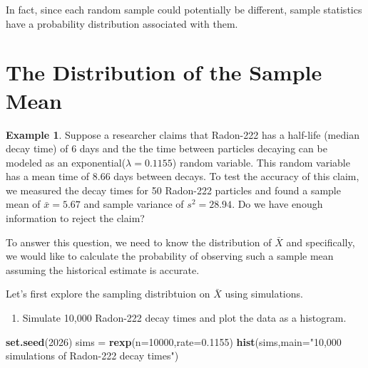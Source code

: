 \documentclass[
  11pt,
  oneside]{book}
\newenvironment{Shaded}{\begin{snugshade}}{\end{snugshade}}
\newcommand{\AttributeTok}[1]{\textcolor[rgb]{0.13,0.29,0.53}{#1}}
\newcommand{\DecValTok}[1]{\textcolor[rgb]{0.00,0.00,0.81}{#1}}
\newcommand{\FloatTok}[1]{\textcolor[rgb]{0.00,0.00,0.81}{#1}}
\newcommand{\FunctionTok}[1]{\textcolor[rgb]{0.13,0.29,0.53}{\textbf{#1}}}
\newcommand{\NormalTok}[1]{#1}
\newcommand{\OtherTok}[1]{\textcolor[rgb]{0.56,0.35,0.01}{#1}}
\newcommand{\StringTok}[1]{\textcolor[rgb]{0.31,0.60,0.02}{#1}}
\providecommand{\tightlist}{%
  \setlength{\itemsep}{0pt}\setlength{\parskip}{0pt}}
\theoremstyle{definition}
\theoremstyle{definition}
\newtheorem{example}{Example}[chapter]
\theoremstyle{definition}
\theoremstyle{definition}
\theoremstyle{remark}
\begin{document}
In fact, since each random sample could potentially be different, sample statistics have a probability distribution associated with them.

\newpage

\section{The Distribution of the Sample Mean}\label{the-distribution-of-the-sample-mean}

\begin{example}
Suppose a researcher claims that Radon-222 has a half-life (median decay time) of 6 days and the the time between particles decaying can be modeled as an exponential(\(\lambda = 0.1155\)) random variable. This random variable has a mean time of 8.66 days between decays. To test the accuracy of this claim, we measured the decay times for 50 Radon-222 particles and found a sample mean of \(\bar{x} = 5.67\) and sample variance of \(s^2 = 28.94\). Do we have enough information to reject the claim?
\end{example}

To answer this question, we need to know the distribution of \(\bar{X}\) and specifically, we would like to calculate the probability of observing such a sample mean assuming the historical estimate is accurate.

\vspace{0.5cm}

Let's first explore the sampling distribtuion on \(\bar{X}\) using simulations.

\vspace{0.5cm}

\begin{enumerate}
\def\labelenumi{(\alph{enumi})}
\tightlist
\item
  Simulate 10,000 Radon-222 decay times and plot the data as a histogram.
\end{enumerate}

\vspace{0.5cm}

\begin{Shaded}
\begin{Highlighting}[]
\FunctionTok{set.seed}\NormalTok{(}\DecValTok{2026}\NormalTok{)}
\NormalTok{sims }\OtherTok{=} \FunctionTok{rexp}\NormalTok{(}\AttributeTok{n=}\DecValTok{10000}\NormalTok{,}\AttributeTok{rate=}\FloatTok{0.1155}\NormalTok{)}
\FunctionTok{hist}\NormalTok{(sims,}\AttributeTok{main=}\StringTok{"10,000 simulations of Radon{-}222 decay times"}\NormalTok{)}
\end{Highlighting}
\end{Shaded}
\end{document}
